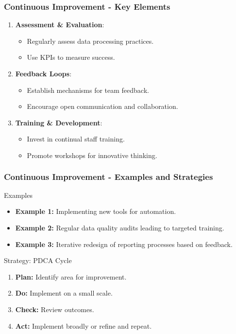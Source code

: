 \documentclass[aspectratio=169]{beamer}
\begin{document}
\begin{frame}[fragile]
    \frametitle{Continuous Improvement - Key Elements}
    \begin{enumerate}
        \item \textbf{Assessment \& Evaluation}:
        \begin{itemize}
            \item Regularly assess data processing practices.
            \item Use KPIs to measure success.
        \end{itemize}
        \item \textbf{Feedback Loops}:
        \begin{itemize}
            \item Establish mechanisms for team feedback.
            \item Encourage open communication and collaboration.
        \end{itemize}
        \item \textbf{Training \& Development}:
        \begin{itemize}
            \item Invest in continual staff training.
            \item Promote workshops for innovative thinking.
        \end{itemize}    
    \end{enumerate}
\end{frame}

\begin{frame}[fragile]
    \frametitle{Continuous Improvement - Examples and Strategies}
    \begin{block}{Examples}
        \begin{itemize}
            \item \textbf{Example 1:} Implementing new tools for automation.
            \item \textbf{Example 2:} Regular data quality audits leading to targeted training.
            \item \textbf{Example 3:} Iterative redesign of reporting processes based on feedback.
        \end{itemize}
    \end{block}
    
    \begin{block}{Strategy: PDCA Cycle}
        \begin{enumerate}
            \item \textbf{Plan:} Identify area for improvement.
            \item \textbf{Do:} Implement on a small scale.
            \item \textbf{Check:} Review outcomes.
            \item \textbf{Act:} Implement broadly or refine and repeat.
        \end{enumerate}
    \end{block}
\end{frame}
\end{document}
